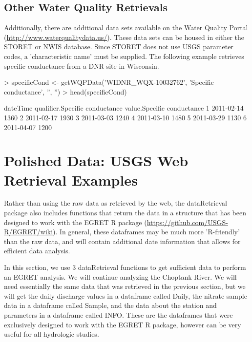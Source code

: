 \documentclass[a4paper,11pt]{article}
\begin{document}
\subsection{Other Water Quality Retrievals}
Additionally, there are additional data sets available on the Water Quality Portal (\url{http://www.waterqualitydata.us/}).  These data sets can be housed in either the STORET or NWIS database.  Since STORET does not use USGS parameter codes, a 'characteristic name' must be supplied.  The following example retrieves specific conductance from a DNR site in Wisconsin.

\begin{Schunk}
\begin{Sinput}
> specificCond <- getWQPData('WIDNR_WQX-10032762', 
         'Specific conductance', '', '')
> head(specificCond)
\end{Sinput}
\begin{Soutput}
    dateTime qualifier.Specific conductance value.Specific conductance
1 2011-02-14                                                      1360
2 2011-02-17                                                      1930
3 2011-03-03                                                      1240
4 2011-03-10                                                      1480
5 2011-03-29                                                      1130
6 2011-04-07                                                      1200
\end{Soutput}
\end{Schunk}


\section{Polished Data: USGS Web Retrieval Examples}
Rather than using the raw data as retrieved by the web, the dataRetrieval package also includes functions that return the data in a structure that has been designed to work with the EGRET R package (\url{https://github.com/USGS-R/EGRET/wiki}). In general, these dataframes may be much more 'R-friendly' than the raw data, and will contain additional date information that allows for efficient data analysis.

In this section, we use 3 dataRetrieval functions to get sufficient data to perform an EGRET analysis.  We will continue analyzing the Choptank River. We will need essentially the same data that was retrieved in the previous section, but we will get the daily discharge values in a dataframe called Daily, the nitrate sample data in a dataframe called Sample, and the data about the station and parameters in a dataframe called INFO. These are the dataframes that were exclusively designed to work with the EGRET R package, however can be very useful for all hydrologic studies.
\end{document}
